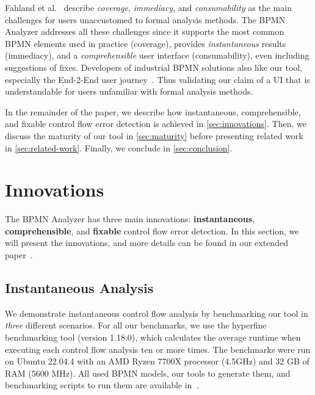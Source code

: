 \documentclass[
twocolumn
]{ceurart}
\begin{document}
Fahland et al.~\cite{fahlandAnalysisDemandInstantaneous2011} describe \textit{coverage}, \textit{immediacy}, and \textit{consumability} as the main challenges for users unaccustomed to formal analysis methods.
The BPMN Analyzer addresses all these challenges since it supports the most common BPMN elements used in practice (coverage), provides \textit{instantaneous} results (immediacy), and a \textit{comprehensible} user interface (consumability), even including suggestions of fixes.
Developers of industrial BPMN solutions also like our tool, especially the End-2-End user journey~\cite{krauterInstantaneousComprehensibleFixable2024}.
Thus validating our claim of a UI that is understandable for users unfamiliar with formal analysis methods.

In the remainder of the paper, we describe how instantaneous, comprehensible, and fixable control flow error detection is achieved in \autoref{sec:innovations}.
Then, we discuss the maturity of our tool in \autoref{sec:maturity} before presenting related work in \autoref{sec:related-work}.
Finally, we conclude in \autoref{sec:conclusion}.

\section{Innovations} \label{sec:innovations} %
The BPMN Analyzer has three main innovations: \textbf{instantaneous}, \textbf{comprehensible}, and \textbf{fixable} control flow error detection.
In this section, we will present the innovations, and more details can be found in our extended paper~\cite{krauterInstantaneousComprehensibleFixable2024}.

\subsection{Instantaneous Analysis}

We demonstrate instantaneous control flow analysis by benchmarking our tool in \textit{three} different scenarios.
For all our benchmarks, we use the hyperfine benchmarking tool \cite{peterHyperfine2023} (version 1.18.0), which calculates the average runtime when executing each control flow analysis ten or more times.
The benchmarks were run on Ubuntu 22.04.4 with an AMD Ryzen 7700X processor (4.5GHz) and 32 GB of RAM (5600 MHz).
All used BPMN models, our tools to generate them, and benchmarking scripts to run them are available in~\cite{krauterInstantaneousComprehensibleFixable2024}.
\end{document}
